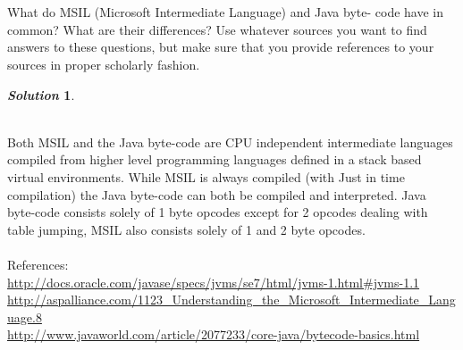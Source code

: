 \documentclass[11pt, a4paper]{article}
\newtheorem*{solution}{\emph{Solution}}
\begin{document}
\section{}
	
What do MSIL (Microsoft Intermediate Language) and Java byte- code have in common? What are their differences?
Use whatever sources you want to find answers to these questions, but make sure that you provide references to your sources in proper scholarly fashion.

\begin{solution}\end{solution}~\\
	Both MSIL and the Java byte-code are CPU independent intermediate languages compiled from higher level programming languages defined in a stack based virtual environments. While MSIL is always compiled (with Just in time compilation) the Java byte-code can both be compiled and interpreted. Java byte-code consists solely of 1 byte opcodes except for 2 opcodes dealing with table jumping, MSIL also consists solely of 1 and 2 byte opcodes.\\~\\
References:\\
\url{http://docs.oracle.com/javase/specs/jvms/se7/html/jvms-1.html#jvms-1.1}\\
\url{http://aspalliance.com/1123_Understanding_the_Microsoft_Intermediate_Language.8}\\
\url{http://www.javaworld.com/article/2077233/core-java/bytecode-basics.html}
\end{document}
